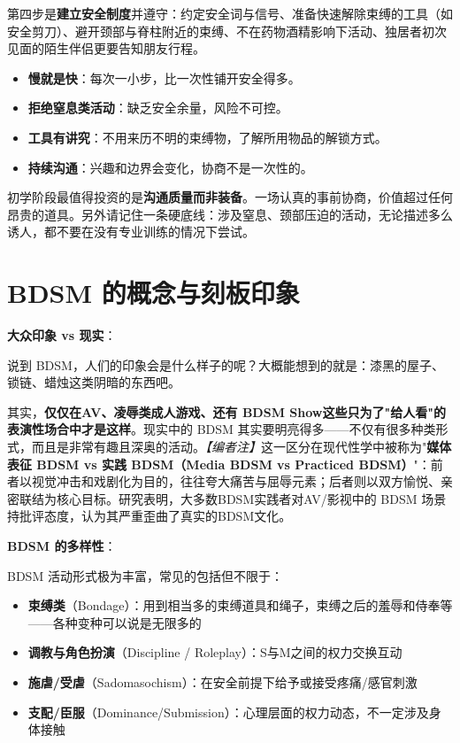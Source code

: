 \documentclass[12pt,UTF8]{ctexbook}
\newcommand{\keyword}[1]{\textbf{#1}}
\begin{document}
第四步是\keyword{建立安全制度}并遵守：约定安全词与信号、准备快速解除束缚的工具（如安全剪刀）、避开颈部与脊柱附近的束缚、不在药物酒精影响下活动、独居者初次见面的陌生伴侣更要告知朋友行程。

\begin{itemize}
  \item \keyword{慢就是快}：每次一小步，比一次性铺开安全得多。
  \item \keyword{拒绝窒息类活动}：缺乏安全余量，风险不可控。
  \item \keyword{工具有讲究}：不用来历不明的束缚物，了解所用物品的解锁方式。
  \item \keyword{持续沟通}：兴趣和边界会变化，协商不是一次性的。
\end{itemize}

\begin{tcolorbox}[colback=pink!5!white,colframe=red!50!black,title=贴心小叮咛]
初学阶段最值得投资的是\keyword{沟通质量而非装备}。一场认真的事前协商，价值超过任何昂贵的道具。另外请记住一条硬底线：涉及窒息、颈部压迫的活动，无论描述多么诱人，都不要在没有专业训练的情况下尝试。
\end{tcolorbox}

\section{BDSM 的概念与刻板印象}

\noindent\textbf{大众印象 vs 现实}：

说到 BDSM，人们的印象会是什么样子的呢？大概能想到的就是：漆黑的屋子、锁链、蜡烛这类阴暗的东西吧。

其实，\textbf{仅仅在AV、凌辱类成人游戏、还有 BDSM Show这些只为了"给人看"的表演性场合中才是这样}。现实中的 BDSM 其实要明亮得多——不仅有很多种类形式，而且是非常有趣且深奥的活动。\textit{【编者注】}这一区分在现代性学中被称为"\textbf{媒体表征 BDSM vs 实践 BDSM（Media BDSM vs Practiced BDSM）}"：前者以视觉冲击和戏剧化为目的，往往夸大痛苦与屈辱元素；后者则以双方愉悦、亲密联结为核心目标。研究表明，大多数BDSM实践者对AV/影视中的 BDSM 场景持批评态度，认为其严重歪曲了真实的BDSM文化。

\noindent\textbf{BDSM 的多样性}：

BDSM 活动形式极为丰富，常见的包括但不限于：

\begin{itemize}
	\item \textbf{束缚类}（Bondage）：用到相当多的束缚道具和绳子，束缚之后的羞辱和侍奉等——各种变种可以说是无限多的
	\item \textbf{调教与角色扮演}（Discipline / Roleplay）：S与M之间的权力交换互动
	\item \textbf{施虐/受虐}（Sadomasochism）：在安全前提下给予或接受疼痛/感官刺激
	\item \textbf{支配/臣服}（Dominance/Submission）：心理层面的权力动态，不一定涉及身体接触
\end{itemize}
\end{document}
